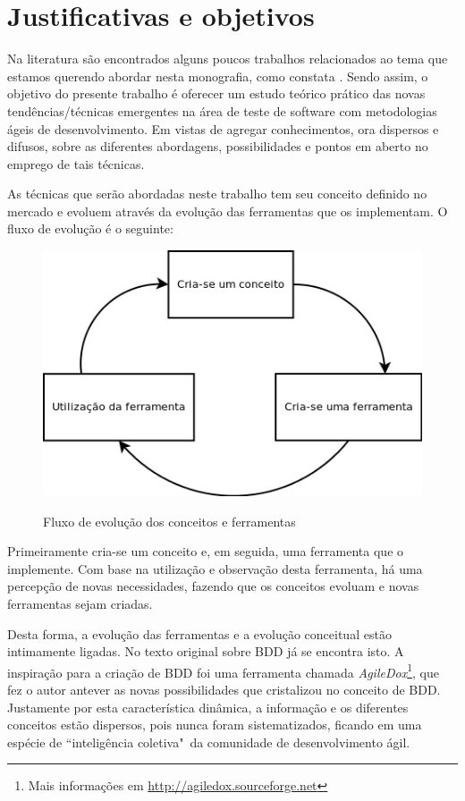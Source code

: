 \section{Justificativas e objetivos}

Na literatura são encontrados alguns poucos trabalhos relacionados ao tema que estamos querendo abordar nesta monografia, como constata . Sendo assim, o objetivo do presente trabalho é oferecer um estudo teórico prático das novas tendências/técnicas emergentes na área de teste de software com metodologias ágeis de desenvolvimento. Em vistas de agregar conhecimentos, ora dispersos e difusos, sobre as diferentes abordagens, possibilidades e pontos em aberto no emprego de tais técnicas.

As técnicas que serão abordadas neste trabalho tem seu conceito definido no mercado e evoluem através da evolução das ferramentas que os implementam. O fluxo de evolução é o seguinte:

\begin{figure}[h]
  \center
  \caption{Fluxo de evolução dos conceitos e ferramentas}
  \includegraphics[scale=0.60]{images/fluxo-conceito-ferramenta}
  \label{img:fluxo_conceito_ferramenta}
\end{figure}

Primeiramente cria-se um conceito e, em seguida, uma ferramenta que o implemente. Com base na utilização e observação desta ferramenta, há uma percepção de novas necessidades, fazendo que os conceitos evoluam e novas ferramentas sejam criadas.

Desta forma, a evolução das ferramentas e a evolução conceitual estão intimamente ligadas. No texto original sobre BDD \cite{IntroducingBDD} já se encontra isto. A inspiração para a criação de BDD foi uma ferramenta chamada \textit{AgileDox}\footnote{Mais informações em \url{http://agiledox.sourceforge.net}}, que fez o autor antever as novas possibilidades que cristalizou no conceito de BDD. Justamente por esta característica dinâmica, a informação e os diferentes conceitos estão dispersos, pois nunca foram sistematizados, ficando em uma espécie de ``inteligência coletiva"\ da comunidade de desenvolvimento ágil.

